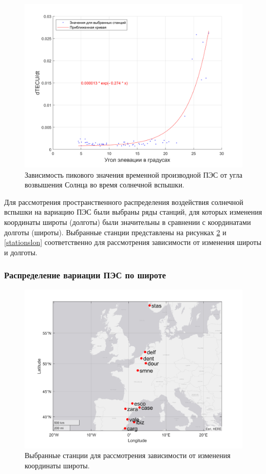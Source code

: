 \documentclass[a4paper]{article}
\begin{document}
\begin{figure}[h!]
\centering
\includegraphics[width = 1\linewidth]{pics/clean_pics/dtec_elev.png}
\caption{Зависимость пикового значения временной производной ПЭС от угла возвышения Солнца во время солнечной вспышки.}
\label{dtecsun}
\end{figure}


Для рассмотрения пространственного распределения воздействия солнечной вспышки на вариацию ПЭС были выбраны ряды станций, для которых изменения координаты широты (долготы) были значительны в сравнении с координатами долготы (широты). Выбранные станции представлены на рисунках \ref{stationslat} и \ref{stationslon} соответственно для рассмотрения зависимости от изменения широты и долготы.

\clearpage
\newpage
\subsubsection{Распределение вариации ПЭС по широте}

\begin{figure}[h!]
\centering
\includegraphics[width = 0.8\linewidth]{pics/clean_pics/latStations.png}
\caption{Выбранные станции для рассмотрения зависимости от изменения координаты широты.}
\label{stationslat}
\end{figure}
\end{document}
